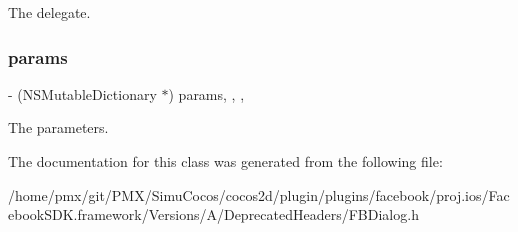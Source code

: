 The delegate. \mbox{\label{interfaceFBDialog_a19b9b51024f653d44d8ac39b0f343046}} 
\subsubsection{\texorpdfstring{params}{params}}
{\footnotesize\ttfamily -\/ (N\+S\+Mutable\+Dictionary $\ast$) params\hspace{0.3cm}{\ttfamily [read]}, {\ttfamily [write]}, {\ttfamily [nonatomic]}, {\ttfamily [retain]}}

The parameters. 

The documentation for this class was generated from the following file\+:\begin{DoxyCompactItemize}
\item 
/home/pmx/git/\+P\+M\+X/\+Simu\+Cocos/cocos2d/plugin/plugins/facebook/proj.\+ios/\+Facebook\+S\+D\+K.\+framework/\+Versions/\+A/\+Deprecated\+Headers/F\+B\+Dialog.\+h\end{DoxyCompactItemize}
